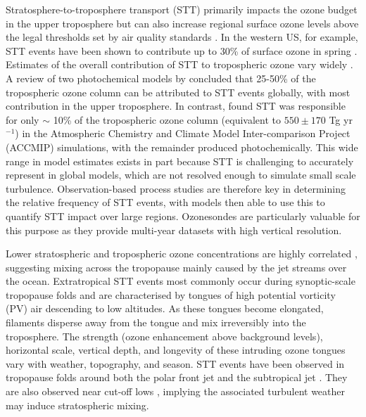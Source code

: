 Stratosphere-to-troposphere transport (STT) primarily impacts the ozone budget in the upper troposphere but can also increase regional surface ozone levels above the legal thresholds set by air quality standards \citep{Danielson1968, Lefohn2011, Langford2012, Zhang2014}.
In the western US, for example, STT events have been shown to contribute up to 30\% of surface ozone in spring \citep{Lin2012}.
Estimates of the overall contribution of STT to tropospheric ozone vary widely \citep[e.g.,][]{Galani2003, Stohl2003, Stevenson2006, Lefohn2011}.
A review of two photochemical models by \citet{Stohl2003} concluded that 25-50\% of the tropospheric ozone column can be attributed to STT events globally, with most contribution in the upper troposphere.
In contrast, \citet{Stevenson2006} found STT was responsible for only $\sim$ 10\% of the tropospheric ozone column (equivalent to $550\pm170$ Tg yr$^{-1}$) in the Atmospheric Chemistry and Climate Model Inter-comparison Project (ACCMIP) simulations, with the remainder produced photochemically.
This wide range in model estimates exists in part because STT is challenging to accurately represent in global models, which are not resolved enough to simulate small scale turbulence.
Observation-based process studies are therefore key in determining the relative frequency of STT events, with models then able to use this to quantify STT impact over large regions.
Ozonesondes are particularly valuable for this purpose as they provide multi-year datasets with high vertical resolution.

Lower stratospheric and tropospheric ozone concentrations are highly correlated \citep{Terao2008}, suggesting mixing across the tropopause mainly caused by the jet streams over the ocean.
Extratropical STT events most commonly occur during synoptic-scale tropopause folds \citep{Sprenger2003, Tang2012, Frey2015} and are characterised by tongues of high potential vorticity (PV) air descending to low altitudes.
As these tongues become elongated, filaments disperse away from the tongue and mix irreversibly into the troposphere.
The strength (ozone enhancement above background levels), horizontal scale, vertical depth, and longevity of these intruding ozone tongues vary with weather, topography, and season.
STT events have been observed in tropopause folds around both the polar front jet \citep{Vaughan1994, Beekmann1997} and the subtropical jet \citep{Baray2000}.
They are also observed near cut-off lows \citep{Price1993, Wirth1995}, implying the associated turbulent weather may induce stratospheric mixing.

